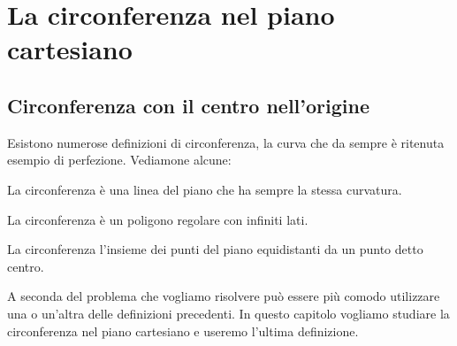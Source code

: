 

\renewcommand{\sistema}[1]{\begin{cases}#1\end{cases}}



\chapter{La circonferenza nel piano cartesiano}

\section{Circonferenza con il centro nell'origine}
\label{sec:circ_circcentroorigine}

% 

Esistono numerose definizioni di circonferenza, la curva che da sempre è ritenuta esempio di 
perfezione. Vediamone alcune:

\begin{definizione}%
 La circonferenza è una linea del piano che ha sempre la stessa curvatura.
\end{definizione}

\begin{definizione}%
 La circonferenza è un poligono regolare con infiniti lati.
\end{definizione}

\begin{definizione}%
 La circonferenza l'insieme dei punti del piano equidistanti da un punto detto 
centro.
\end{definizione}

A seconda del problema che vogliamo risolvere può essere più comodo utilizzare 
una o un'altra delle definizioni precedenti. In questo capitolo vogliamo 
studiare la circonferenza nel piano cartesiano e useremo l'ultima definizione.


